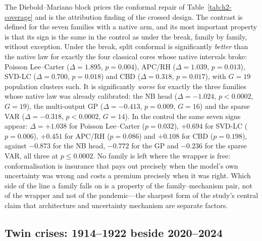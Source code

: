 The Diebold--Mariano block prices the conformal repair of
Table~\ref{tab:h2-coverage} and is the attribution finding of the crossed
design. The contrast is defined for the seven families with a native arm,
and its most important property is that its sign is the same in the
control as under the break, family by family, without exception. Under
the break, split conformal is significantly \emph{better} than the native
law for exactly the four classical cores whose native intervals broke:
Poisson Lee--Carter ($\Delta=1.895$, $p=0.004$), APC/RH ($\Delta=1.039$,
$p=0.013$), SVD-LC ($\Delta=0.700$, $p=0.018$) and CBD ($\Delta=0.318$,
$p=0.017$), with $G=19$ population clusters each. It is significantly
\emph{worse} for exactly the three families whose native law was already
calibrated: the NB head ($\Delta=-1.024$, $p<0.0002$, $G=19$), the
multi-output GP ($\Delta=-0.413$, $p=0.009$, $G=16$) and the sparse VAR
($\Delta=-0.318$, $p<0.0002$, $G=14$). In the control the same seven signs
appear: $\Delta=+1.038$ for Poisson Lee--Carter ($p=0.032$), $+0.694$ for
SVD-LC ($p=0.006$), $+0.451$ for APC/RH ($p=0.086$) and $+0.108$ for CBD
($p=0.198$), against $-0.873$ for the NB head, $-0.772$ for the GP and
$-0.236$ for the sparse VAR, all three at $p\le0.0002$. No family is left
where the wrapper is free: conformalisation is insurance that pays out
precisely when the model's own uncertainty was wrong and costs a premium
precisely when it was right. Which side of the line a family falls on is a
property of the family--mechanism pair, not of the wrapper and not of the
pandemic---the sharpest form of the study's central claim that
architecture and uncertainty mechanism are separate factors.

\subsection{Twin crises: 1914--1922 beside 2020--2024}

\begin{table}[htbp]\centering
\caption{Placebo (train to 1913, test 1914--1922, eleven populations) and
shift (train to 2019, test 2020--2024, twenty populations) side by side:
marginal 95\% and joint path coverage by family and mechanism, with the
placebo strata of Addendum~1 as a further column. Joint coverage spans
$H=9$ placebo and $H=5$ shift horizons---not one scale. The sparse
VAR's empty placebo cells are a finding rather than a gap, and are
read in the text below.}
\label{tab:twin-crises}
\end{table}

